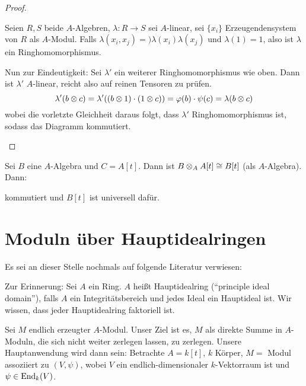 \documentclass[12pt,a4paper]{scrartcl}
\theoremstyle{cplain}
\theoremstyle{cdef}
\begin{document}
\begin{proof}
\begin{enumerate}[label=\ref{thm:314:\roman*}]
		\begin{bem}
			Seien $R,S$ beide $A$-Algebren, $\lambda\colon R\to S$ sei $A$-linear, sei $\{x_i\}$ Erzeugendensystem von $R$ als $A$-Modul. Falls $\lambda(x_i,x_j) =)\lambda(x_i)\lambda(x_j)$ und $\lambda(1) = 1$, also ist $\lambda$ ein Ringhomomorphismus.
		\end{bem}
	
		Nun zur Eindeutigkeit: Sei $\lambda'$ ein weiterer Ringhomomorphismus wie oben. Dann ist $\lambda'$ $A$-linear, reicht also auf reinen Tensoren zu prüfen.
		$$\lambda'(b\otimes c) = \lambda'((b\otimes 1)\cdot(1\otimes c)) = \varphi(b)\cdot \psi(c) = \lambda(b\otimes c)$$
		wobei die vorletzte Gleichheit daraus folgt, dass $\lambda'$ Ringhomomorphismus ist, sodass das Diagramm kommutiert.
		\qedhere
	\end{enumerate}
\end{proof}

\begin{bsp}
	Sei $B$ eine $A$-Algebra und $C= A[t]$. Dann ist $B\otimes_AA[t]\cong B[t]$ (als $A$-Algebra). Dann:	
	\begin{center}
	\end{center}
	kommutiert und $B[t]$ ist universell dafür.
\end{bsp}


\section{Moduln über Hauptidealringen}
\label{sec:moduln ueber hir}

Es sei an dieser Stelle nochmals auf folgende Literatur verwiesen:

\printbibliography[keyword=moduln-hir,heading=none]

Zur Erinnerung: Sei $A$ ein Ring. $A$ heißt Hauptidealring (\enquote{principle ideal domain}), falls $A$ ein Integritätsbereich und jedes Ideal ein Hauptideal ist. Wir wissen, dass jeder Hauptidealring faktoriell ist.

Sei $M$ endlich erzeugter $A$-Modul. Unser Ziel ist es, $M$ als direkte Summe in $A$-Moduln, die sich nicht weiter zerlegen lassen, zu zerlegen. Unsere Hauptanwendung wird dann sein: Betrachte $A = k[t]$, $k$ Körper, $M=$ Modul assoziiert zu $(V,\psi)$, wobei $V$ ein endlich-dimensionaler $k$-Vektorraum ist und $\psi\in\operatorname{End}_k(V)$.
\end{document}
